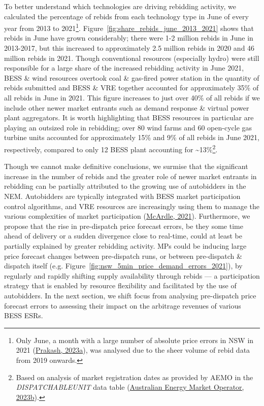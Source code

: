 \documentclass[12pt,a4paper,]{report}
\begin{document}
To better understand which technologies are driving rebidding activity,
we calculated the percentage of rebids from each technology type in June
of every year from 2013 to 2021\footnote{Only June, a month with a large
  number of absolute price errors in NSW in 2021
  (\protect\hyperlink{ref-prakashEnergyPriceConvergence2023}{Prakash,
  2023a}), was analysed due to the sheer volume of rebid data from 2019
  onwards.}. Figure~\ref{fig:share_rebids_june_2013_2021} shows that
rebids in June have grown considerably; there were 1-2 million rebids in
June in 2013-2017, but this increased to approximately 2.5 million
rebids in 2020 and 46 million rebids in 2021. Though conventional
resources (especially hydro) were still responsible for a large share of
the increased rebidding activity in June 2021, BESS \& wind resources
overtook coal \& gas-fired power station in the quantity of rebids
submitted and BESS \& VRE together accounted for approximately 35\% of
all rebids in June in 2021. This figure increases to just over 40\% of
all rebids if we include other newer market entrants such as demand
response \& virtual power plant aggregators. It is worth highlighting
that BESS resources in particular are playing an outsized role in
rebidding; over 80 wind farms and 60 open-cycle gas turbine units
accounted for approximately 15\% and 9\% of all rebids in June 2021,
respectively, compared to only 12 BESS plant accounting for
\textasciitilde13\%\footnote{Based on analysis of market registration
  dates as provided by AEMO in the \emph{DISPATCHABLEUNIT} data table
  (\protect\hyperlink{ref-australianenergymarketoperatorMMSDataModel2023}{Australian
  Energy Market Operator, 2023b}).}.

Though we cannot make definitive conclusions, we surmise that the
significant increase in the number of rebids and the greater role of
newer market entrants in rebidding can be partially attributed to the
growing use of autobidders in the NEM. Autobidders are typically
integrated with BESS market participation control algorithms, and VRE
resources are increasingly using them to manage the various complexities
of market participation
(\protect\hyperlink{ref-mcardleRiseAutobidder2021}{McArdle, 2021}).
Furthermore, we propose that the rise in pre-dispatch price forecast
errors, be they some time ahead of delivery or a sudden divergence close
to real-time, could at least be partially explained by greater rebidding
activity. MPs could be inducing large price forecast changes between
pre-dispatch runs, or between pre-dispatch \& dispatch itself (e.g.
Figure~\ref{fig:nsw_5min_price_demand_errors_2021}), by regularly and
rapidly shifting supply availability through rebids --- a participation
strategy that is enabled by resource flexibility and facilitated by the
use of autobidders. In the next section, we shift focus from analysing
pre-dispatch price forecast errors to assessing their impact on the
arbitrage revenues of various BESS ESRs.
\end{document}
